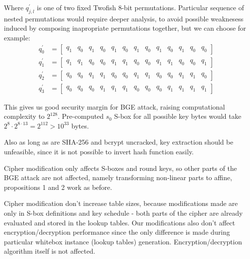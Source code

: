 \documentclass[11pt,oneside,final]{fithesis2}
\begin{document}
    Where $q^{\prime}_{j,l}$ is one of two fixed Twofish 8-bit permutations. Particular sequence of nested permutations would require deeper analysis, to avoid possible weaknesess 
    induced by composing inapropriate permutations together, but we can choose for example:
    \setcounter{MaxMatrixCols}{13}
    \begin{subequations}
    \begin{align}
	q^{\prime}_{0} &= \begin{bmatrix}  q_1 & q_0 & q_1 & q_0 & q_1 & q_0 & q_1 & q_0 & q_1 & q_0 & q_1 & q_0 & q_0 \end{bmatrix}\\
	q^{\prime}_{1} &= \begin{bmatrix}  q_1 & q_1 & q_0 & q_0 & q_1 & q_1 & q_0 & q_0 & q_1 & q_1 & q_0 & q_0 & q_1 \end{bmatrix}\\
	q^{\prime}_{2} &= \begin{bmatrix}  q_0 & q_0 & q_1 & q_1 & q_0 & q_0 & q_1 & q_1 & q_0 & q_0 & q_1 & q_1 & q_0 \end{bmatrix}\\
	q^{\prime}_{3} &= \begin{bmatrix}  q_0 & q_0 & q_0 & q_1 & q_1 & q_1 & q_0 & q_0 & q_0 & q_1 & q_1 & q_1 & q_1 \end{bmatrix}
    \end{align}
    \end{subequations}

    This gives us good security margin for BGE attack, raising computational complexity to $2^{128}$. 
    Pre-computed $s_0$ S-box for all possible key bytes would take $2^8 \cdot 2^{8\cdot13} = 2^{112} > 10^{33}$ bytes. 

    Also as long as are SHA-256 and bcrypt uncracked, key extraction should be unfeasible, since it is not possible
    to invert hash function easily. 

    Cipher modification only affects S-boxes and round keys, so other parts of the BGE attack are not affected, namely transforming non-linear parts
    to affine, propositions 1 and 2 work as before. 

    Cipher modification don't increase table sizes, because modifications made are only in S-box definitions and key schedule - both 
    parts of the cipher are already evaluated and stored in the lookup tables. Our modifications also don't affect encryption/decryption performance since the only
    difference is made during particular whitebox instance (lookup tables) generation. Encryption/decryption algorithm itself is not affected.
    
\end{document}
